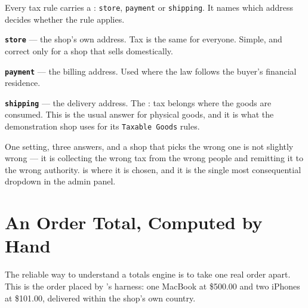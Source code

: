 \begin{conceptbox}
Every tax rule carries a : \texttt{store}, \texttt{payment} or
\texttt{shipping}. It names which address decides whether the rule applies.

\begin{tight}
  \item \textbf{\texttt{store}} --- the shop's own address. Tax is the same for
        everyone. Simple, and correct only for a shop that sells domestically.
  \item \textbf{\texttt{payment}} --- the billing address. Used where the law
        follows the buyer's financial residence.
  \item \textbf{\texttt{shipping}} --- the delivery address. The
        : tax belongs where the goods are consumed.
        This is the usual answer for physical goods, and it is what the
        demonstration shop uses for its \texttt{Taxable Goods} rules.
\end{tight}

\smallskip
One setting, three answers, and a shop that picks the wrong one is not slightly
wrong --- it is collecting the wrong tax from the wrong people and remitting it
to the wrong authority.  is
where it is chosen, and it is the single most consequential dropdown in the
admin panel.
\end{conceptbox}

\section{An Order Total, Computed by Hand}

The reliable way to understand a totals engine is to take one real order apart.
This is the order placed by 's harness: one MacBook at
\$500.00 and two iPhones at \$101.00, delivered within the shop's own country.

